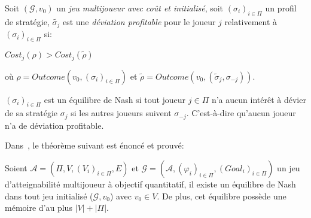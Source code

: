 
\begin{defi}
	
	Soit $(\mathcal{G}, v_{0})$ un \textit{jeu multijoueur avec coût et initialisé}, soit $(\sigma _{i})_{i \in \Pi}$ un profil de stratégie, $\tilde{\sigma _{j}}$ est une \textit{déviation profitable} pour le joueur $j$ relativement à $(\sigma _{i})_{i \in \Pi}$ si:
	\begin{center} $ Cost_{j}(\rho) > Cost_{j}(\tilde{\rho})$ \end{center}
	où $\rho = Outcome(v_{0},(\sigma _{i})_{i \in \Pi})$ et $\tilde{\rho} = Outcome(v_{0}, (\tilde{\sigma} _{j} ,\sigma _{-j}))$. 
\end{defi}

\begin{rem}
	$(\sigma _{i})_{i\in \Pi}$ est un équilibre de Nash si tout joueur $j \in \Pi$ n'a aucun intérêt à dévier de sa stratégie $\sigma _{j}$ si les autres joueurs suivent $\sigma _{-j}$. C'est-à-dire qu'aucun joueur n'a de déviation profitable. 
\end{rem}





 Dans~\cite{DBLP:conf/lfcs/BrihayePS13}, le théorème suivant est énoncé et prouvé:

\begin{thm}
	Soient $\mathcal{A} = (\Pi, V, (V_{i})_{i \in \Pi}, E)$ et $\mathcal{G} = (\mathcal{A},(\varphi _{i})_{i \in \Pi}, (Goal_{i})_{i \in \Pi})$ un jeu d'atteignabilité multijoueur à objectif quantitatif, il existe un équilibre de Nash dans tout jeu initialisé ($\mathcal{G},v_{0}$) avec $v_{0}\in V$. De plus, cet équilibre possède une mémoire d'au plus $|V| + |\Pi|$.
\end{thm}

